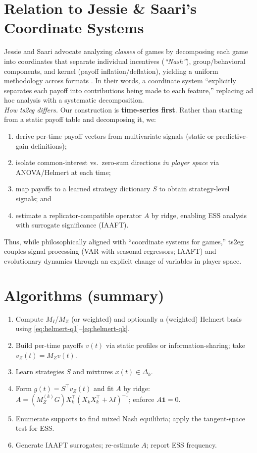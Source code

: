 \documentclass[11pt]{article}
\newcommand{\one}{\mathbf{1}}
\begin{document}
\section{Relation to Jessie \& Saari's Coordinate Systems}
Jessie and Saari advocate analyzing \emph{classes} of games by decomposing each game into coordinates that separate individual incentives (\emph{``Nash''}), group/behavioral components, and kernel (payoff inflation/deflation), yielding a uniform methodology across formats \cite{jessie-saari}. In their words, a coordinate system ``explicitly separates each payoff into contributions being made to each feature,'' replacing ad hoc analysis with a systematic decomposition.\\[4pt]
\emph{How ts2eg differs.} Our construction is \textbf{time-series first}. Rather than starting from a static payoff table and decomposing it, we:
\begin{enumerate}[leftmargin=*]
\item derive per-time payoff vectors from multivariate signals (static or predictive-gain definitions);
\item isolate common-interest vs.\ zero-sum directions \emph{in player space} via ANOVA/Helmert at each time;
\item map payoffs to a learned strategy dictionary $S$ to obtain strategy-level signals; and
\item estimate a replicator-compatible operator $A$ by ridge, enabling ESS analysis with surrogate significance (IAAFT).
\end{enumerate}
Thus, while philosophically aligned with ``coordinate systems for games,'' ts2eg couples signal processing (VAR with seasonal regressors; IAAFT) and evolutionary dynamics through an explicit change of variables in player space.

\section{Algorithms (summary)}
\begin{enumerate}[leftmargin=*]
\item Compute $M_I$/$M_Z$ (or weighted) and optionally a (weighted) Helmert basis using \eqref{eq:helmert-q1}–\eqref{eq:helmert-qk}.
\item Build per-time payoffs $v(t)$ via static profiles or information-sharing; take $v_Z(t)=M_Z v(t)$.
\item Learn strategies $S$ and mixtures $x(t)\in\Delta_k$.
\item Form $g(t)=S^\top v_Z(t)$ and fit $A$ by ridge: $A=(M_Z^{(k)}G)X_k^\top(X_kX_k^\top+\lambda I)^{-1}$; enforce $A\one=0$.
\item Enumerate supports to find mixed Nash equilibria; apply the tangent-space test for ESS.
\item Generate IAAFT surrogates; re-estimate $A$; report ESS frequency.
\end{enumerate}
\end{document}
